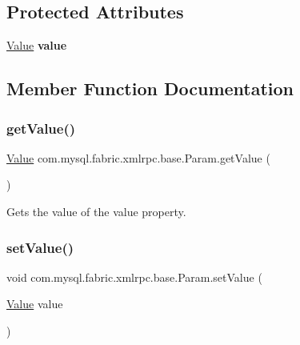 \subsection*{Protected Attributes}
\begin{DoxyCompactItemize}
\item 
\mbox{\label{classcom_1_1mysql_1_1fabric_1_1xmlrpc_1_1base_1_1_param_ac5daa5df70a3d8442f71f0c475846ba9}} 
\mbox{\hyperlink{classcom_1_1mysql_1_1fabric_1_1xmlrpc_1_1base_1_1_value}{Value}} {\bfseries value}
\end{DoxyCompactItemize}


\subsection{Member Function Documentation}
\mbox{\label{classcom_1_1mysql_1_1fabric_1_1xmlrpc_1_1base_1_1_param_a900a547d8eee46bffc36a3b6dae26732}} 
\subsubsection{\texorpdfstring{get\+Value()}{getValue()}}
{\footnotesize\ttfamily \mbox{\hyperlink{classcom_1_1mysql_1_1fabric_1_1xmlrpc_1_1base_1_1_value}{Value}} com.\+mysql.\+fabric.\+xmlrpc.\+base.\+Param.\+get\+Value (\begin{DoxyParamCaption}{ }\end{DoxyParamCaption})}

Gets the value of the value property. \mbox{\label{classcom_1_1mysql_1_1fabric_1_1xmlrpc_1_1base_1_1_param_a05bd730ae6c96273ac1edbb362045867}} 
\subsubsection{\texorpdfstring{set\+Value()}{setValue()}}
{\footnotesize\ttfamily void com.\+mysql.\+fabric.\+xmlrpc.\+base.\+Param.\+set\+Value (\begin{DoxyParamCaption}\item[{\mbox{\hyperlink{classcom_1_1mysql_1_1fabric_1_1xmlrpc_1_1base_1_1_value}{Value}}}]{value }\end{DoxyParamCaption})}

